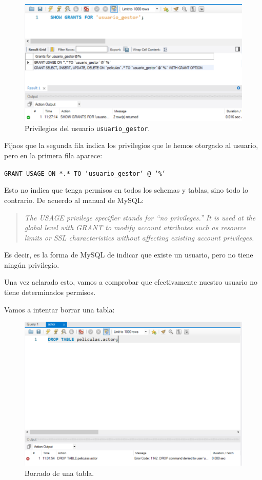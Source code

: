 \documentclass[a4paper]{article}
\begin{document}
\begin{figure}[H]
    \centering
    \includegraphics[width=\textwidth]{figs/gestion-usuarios/grants_usuario.PNG}
    \caption{Privilegios del usuario \texttt{usuario\_gestor}.}
    \label{fig:grants-usuario}
\end{figure}

Fijaos que la segunda fila indica los privilegios que le hemos otorgado al usuario, pero en la primera fila aparece:

\texttt{GRANT USAGE ON *.* TO `usuario\_gestor` @ `\%`}


Esto no indica que tenga permisos en todos los schemas y tablas, sino todo lo contrario. De acuerdo al manual de MySQL:

\begin{quote}
    \textit{The USAGE privilege specifier stands for ``no privileges.'' It is used at the global level with GRANT to modify account attributes such as resource limits or SSL characteristics without affecting existing account privileges.}
\end{quote}

Es decir, es la forma de MySQL de indicar que existe un usuario, pero no tiene ningún privilegio. 

Una vez aclarado esto, vamos a comprobar que efectivamente nuestro usuario no tiene determinados permisos.

Vamos a intentar borrar una tabla:

\begin{figure}[H]
    \centering
    \includegraphics[width=\textwidth]{figs/gestion-usuarios/drop_usr.PNG}
    \caption{Borrado de una tabla.}
    \label{fig:borrar}
\end{figure}
\end{document}
